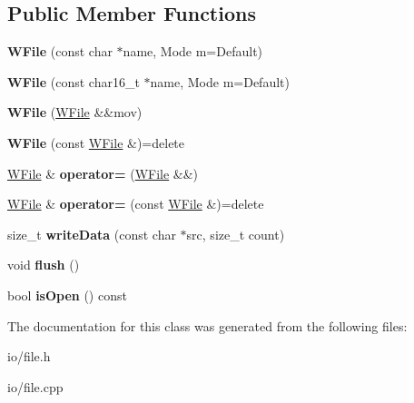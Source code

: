 \subsection*{Public Member Functions}
\begin{DoxyCompactItemize}
\item 
\hypertarget{class_tempest_1_1_w_file_ab5d054c42cdfe3da84b5bc29f56596ae}{{\bfseries W\+File} (const char $\ast$name, Mode m=Default)}\label{class_tempest_1_1_w_file_ab5d054c42cdfe3da84b5bc29f56596ae}

\item 
\hypertarget{class_tempest_1_1_w_file_a2894e1a45875a9440e2fd2ef82655886}{{\bfseries W\+File} (const char16\+\_\+t $\ast$name, Mode m=Default)}\label{class_tempest_1_1_w_file_a2894e1a45875a9440e2fd2ef82655886}

\item 
\hypertarget{class_tempest_1_1_w_file_a260ba69984d8fc2294628b71726eb2aa}{{\bfseries W\+File} (\hyperlink{class_tempest_1_1_w_file}{W\+File} \&\&mov)}\label{class_tempest_1_1_w_file_a260ba69984d8fc2294628b71726eb2aa}

\item 
\hypertarget{class_tempest_1_1_w_file_ace156fa06ea9ccf3f2ef7c84b7c9bd04}{{\bfseries W\+File} (const \hyperlink{class_tempest_1_1_w_file}{W\+File} \&)=delete}\label{class_tempest_1_1_w_file_ace156fa06ea9ccf3f2ef7c84b7c9bd04}

\item 
\hypertarget{class_tempest_1_1_w_file_ad87655bc1e71fd299a3a40489149d38e}{\hyperlink{class_tempest_1_1_w_file}{W\+File} \& {\bfseries operator=} (\hyperlink{class_tempest_1_1_w_file}{W\+File} \&\&)}\label{class_tempest_1_1_w_file_ad87655bc1e71fd299a3a40489149d38e}

\item 
\hypertarget{class_tempest_1_1_w_file_ae72c5bc1f296f1f962ebb157bc7708a4}{\hyperlink{class_tempest_1_1_w_file}{W\+File} \& {\bfseries operator=} (const \hyperlink{class_tempest_1_1_w_file}{W\+File} \&)=delete}\label{class_tempest_1_1_w_file_ae72c5bc1f296f1f962ebb157bc7708a4}

\item 
\hypertarget{class_tempest_1_1_w_file_a49f06806fc9931127a72cfa04a1bcb94}{size\+\_\+t {\bfseries write\+Data} (const char $\ast$src, size\+\_\+t count)}\label{class_tempest_1_1_w_file_a49f06806fc9931127a72cfa04a1bcb94}

\item 
\hypertarget{class_tempest_1_1_w_file_a4ffa651e6d5479831f248019a7cd9fa0}{void {\bfseries flush} ()}\label{class_tempest_1_1_w_file_a4ffa651e6d5479831f248019a7cd9fa0}

\item 
\hypertarget{class_tempest_1_1_w_file_a401b84035e80dadf99a414e65c7998d2}{bool {\bfseries is\+Open} () const }\label{class_tempest_1_1_w_file_a401b84035e80dadf99a414e65c7998d2}

\end{DoxyCompactItemize}


The documentation for this class was generated from the following files\+:\begin{DoxyCompactItemize}
\item 
io/file.\+h\item 
io/file.\+cpp\end{DoxyCompactItemize}
